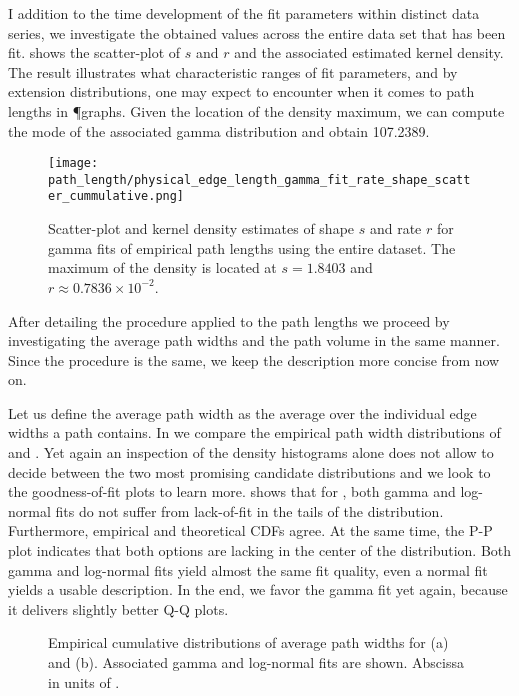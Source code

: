 		I addition to the time development of the fit parameters within distinct data series, we investigate the obtained values across the entire data set that has been fit.  shows the scatter-plot of $s$ and $r$ and the associated estimated kernel density. The result illustrates what characteristic ranges of fit parameters, and by extension distributions, one may expect to encounter when it comes to path lengths in \P graphs. Given the location of the density maximum, we can compute the mode of the associated gamma distribution and obtain \SI{107.2389}{\pixel}.

		\begin{figure}[!htbp]
			\centering
				\texttt{[image: path\_length/physical\_edge\_length\_gamma\_fit\_rate\_shape\_scatter\_cummulative.png]}
			\caption[Path length distribution - Fit parameter densities]{Scatter-plot and kernel density estimates of shape $s$ and rate $r$ for gamma fits of empirical path lengths using the entire dataset. The maximum of the density is located at $s = 1.8403$ and $r \approx 0.7836 \times 10^{-2}$.}
			\label{fig:path_lengths_gamma_fit_kde}
		\end{figure}

		After detailing the procedure applied to the path lengths we proceed by investigating the average path widths and the path volume in the same manner. Since the procedure is the same, we keep the description more concise from now on.

		Let us define the average path width as the average over the individual edge widths a path contains. In  we compare the empirical path width distributions of  and . Yet again an inspection of the density histograms alone does not allow to decide between the two most promising candidate distributions and we look to the goodness-of-fit plots to learn more.  shows that for , both gamma and log-normal fits do not suffer from lack-of-fit in the tails of the distribution. Furthermore, empirical and theoretical CDFs agree. At the same time, the P-P plot indicates that both options are lacking in the center of the distribution. Both gamma and log-normal fits yield almost the same fit quality, even a normal fit yields a usable description. In the end, we favor the gamma fit yet again, because it delivers slightly better Q-Q plots. 

		\begin{figure}
			\centering
			\qquad

			\caption[Path width distribution]{Empirical cumulative distributions of average path widths for  (a) and  (b). Associated gamma and log-normal fits are shown. Abscissa in units of \si{\pixel}.}
			\label{fig:path_widths}
		\end{figure}

